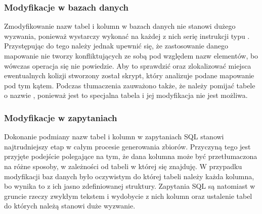 

\subsubsection{Modyfikacje w bazach danych}
Zmodyfikowanie nazw tabel i kolumn w bazach danych nie stanowi dużego wyzwania, ponieważ wystarczy wykonać na każdej z nich serię instrukcji typu . Przystępując do tego należy jednak upewnić się, że zastosowanie danego mapowanie nie tworzy konfliktujących ze sobą pod względem nazw elementów, bo wówczas operacja się nie powiedzie. Aby to sprawdzić oraz zlokalizować miejsca ewentualnych kolizji stworzony został skrypt, który analizuje podane mapowanie pod tym kątem. Podczas tłumaczenia zauważono także, że należy pomijać tabele o nazwie , ponieważ jest to specjalna tabela i jej modyfikacja nie jest możliwa.

\subsubsection{Modyfikacje w zapytaniach}
Dokonanie podmiany nazw tabel i kolumn w zapytaniach SQL stanowi najtrudniejszy etap w całym procesie generowania zbiorów. Przyczyną tego jest przyjęte podejście polegające na tym, że dana kolumna może być przetłumaczona na różne sposoby, w zależności od tabeli w której się znajduję. W przypadku modyfikacji baz danych było oczywistym do której tabeli należy każda kolumna, bo wynika to z ich jasno zdefiniowanej struktury. Zapytania SQL są natomiast w gruncie rzeczy zwykłym tekstem i wydobycie z nich kolumn oraz ustalenie tabel do których należą stanowi duże wyzwanie.

